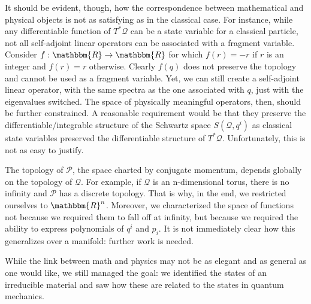 \documentclass[aps,pra,10pt,twocolumn,floatfix,nofootinbib]{revtex4-1}
\numberwithin{equation}{section}
\theoremstyle{definition}
\begin{document}
It should be evident, though, how the correspondence between mathematical and physical objects is not as satisfying as in the classical case. For instance, while any differentiable function of $T^*\mathcal{Q}$ can be a state variable for a classical particle, not all self-adjoint linear operators can be associated with a fragment variable. Consider $f: \mathbbm{R} \rightarrow \mathbbm{R}$ for which $f(r) = -r$ if $r$ is an integer and $f(r) = r$ otherwise. Clearly $f(q)$ does not preserve the topology and cannot be used as a fragment variable. Yet, we can still create a self-adjoint linear operator, with the same spectra as the one associated with $q$, just with the eigenvalues switched. The space of physically meaningful operators, then, should be further constrained. A reasonable requirement would be that they preserve the differentiable/integrable structure of the Schwartz space $S(\mathcal{Q}, q^i)$ as classical state variables preserved the differentiable structure of $T^*\mathcal{Q}$. Unfortunately, this is not as easy to justify.

The topology of $\mathcal{P}$, the space charted by conjugate momentum, depends globally on the topology of $\mathcal{Q}$. For example, if $\mathcal{Q}$ is an n-dimensional torus, there is no infinity and $\mathcal{P}$ has a discrete topology. That is why, in the end, we restricted ourselves to $\mathbbm{R}^n$. Moreover, we characterized the space of functions not because we required them to fall off at infinity, but because we required the ability to express polynomials of $q^i$ and $p_i$. It is not immediately clear how this generalizes over a manifold: further work is needed.

While the link between math and physics may not be as elegant and as general as one would like, we still managed the goal: we identified the states of an irreducible material and saw how these are related to the states in quantum mechanics.


\end{document}
